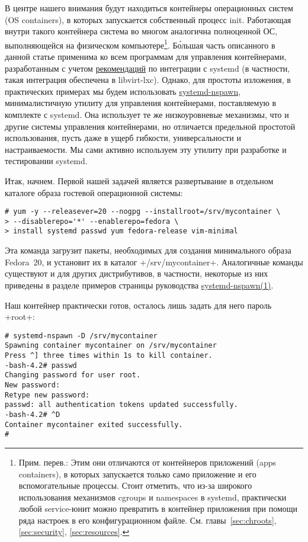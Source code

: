 \documentclass[10pt,oneside,a4paper]{article}
\begin{document}
В центре нашего внимания будут находиться контейнеры операционных систем (OS
containers), в которых запускается собственный процесс init. Работающая внутри
такого контейнера система во многом аналогична полноценной ОС, выполняющейся на
физическом компьютере\footnote{Прим. перев.: Этим они отличаются от контейнеров
приложений (apps containers), в которых запускается только само приложение и его
вспомогательные процессы. Стоит отметить, что из-за широкого использования
механизмов cgroups и namespaces в systemd, практически любой service-юнит можно
превратить в контейнер приложения при помощи ряда настроек в его
конфигурационном файле. См. главы~\ref{sec:chroots}, \ref{sec:security},
\ref{sec:resources}.}. Б\'{о}льшая часть описанного в данной статье применима ко
всем программам для управления контейнерами, разработанным с учетом
\href{http://www.freedesktop.org/wiki/Software/systemd/ContainerInterface/}{рекомендаций}
по интеграции с systemd (в частности, такая интеграция обеспечена в libvirt-lxc).
Однако, для простоты изложения, в практических примерах мы будем использовать
\href{http://www.freedesktop.org/software/systemd/man/systemd-nspawn.html}{systemd-nspawn},
минималистичную утилиту для управления контейнерами, поставляемую в комплекте с
systemd. Она использует те же низкоуровневые механизмы, что и другие системы
управления контейнерами, но отличается предельной простотой использования, пусть
даже в ущерб гибкости, универсальности и настраиваемости. Мы сами активно
используем эту утилиту при разработке и тестировании systemd.

Итак, начнем. Первой нашей задачей является развертывание в отдельном каталоге
образа гостевой операционной системы:
\begin{Verbatim}
# yum -y --releasever=20 --nogpg --installroot=/srv/mycontainer \
> --disablerepo='*' --enablerepo=fedora \
> install systemd passwd yum fedora-release vim-minimal
\end{Verbatim}

Эта команда загрузит пакеты, необходимых для создания минимального образа
Fedora~20, и установит их в каталог +/srv/mycontainer+. Аналогичные команды
существуют и для других дистрибутивов, в частности, некоторые из них приведены в
разделе примеров страницы руководства
\href{http://www.freedesktop.org/software/systemd/man/systemd-nspawn.html\#Examples}{systemd-nspawn(1)}.

Наш контейнер практически готов, осталось лишь задать для него пароль +root+:
\begin{Verbatim}
# systemd-nspawn -D /srv/mycontainer
Spawning container mycontainer on /srv/mycontainer
Press ^] three times within 1s to kill container.
-bash-4.2# passwd
Changing password for user root.
New password:
Retype new password:
passwd: all authentication tokens updated successfully.
-bash-4.2# ^D
Container mycontainer exited successfully.
#
\end{Verbatim}
\end{document}
